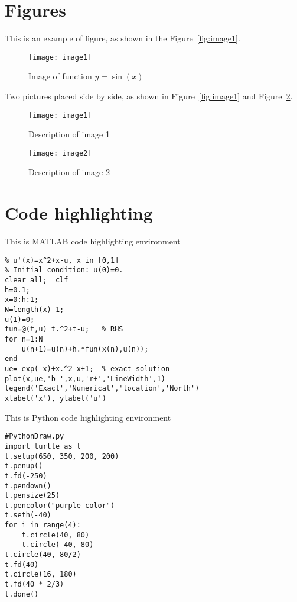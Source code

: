 \documentclass[12pt,en]{homework}
\begin{document}
\section*{Figures}

This is an example of figure, as shown in the Figure~\ref{fig:image1}.

\begin{figure}[htp!]
\centering
\texttt{[image: image1]}
\caption{Image of function $y=\sin(x)$}
\label{fig:sinx}
\end{figure}

Two pictures placed side by side, as shown in Figure~\ref{fig:image1} and Figure~\ref{fig:image2}.

\begin{figure}[!htp]
\begin{minipage}[h]{0.48\linewidth}
\centering
\texttt{[image: image1]}
\caption{Description of image 1}
\label{fig:image1}
\end{minipage}
\begin{minipage}[h]{0.48\linewidth}
\centering
\texttt{[image: image2]}
\caption{Description of image 2}
\label{fig:image2}
\end{minipage}
\end{figure}


\clearpage
\section*{Code highlighting}

This is MATLAB code highlighting environment


\begin{lstlisting}[style=matlab,title={MATLAB code}]
% Euler method for the ODE model
% u'(x)=x^2+x-u, x in [0,1]
% Initial condition: u(0)=0.
clear all;  clf
h=0.1;
x=0:h:1;
N=length(x)-1;
u(1)=0;
fun=@(t,u) t.^2+t-u;   % RHS
for n=1:N
    u(n+1)=u(n)+h.*fun(x(n),u(n));
end
ue=-exp(-x)+x.^2-x+1;  % exact solution
plot(x,ue,'b-',x,u,'r+','LineWidth',1)
legend('Exact','Numerical','location','North')
xlabel('x'), ylabel('u')
\end{lstlisting}

This is Python code highlighting environment

\begin{lstlisting}[style=python,title={Python code}]
#PythonDraw.py
import turtle as t
t.setup(650, 350, 200, 200)
t.penup()
t.fd(-250)
t.pendown()
t.pensize(25)
t.pencolor("purple color")
t.seth(-40)
for i in range(4):
    t.circle(40, 80)
    t.circle(-40, 80)
t.circle(40, 80/2)
t.fd(40)
t.circle(16, 180)
t.fd(40 * 2/3)
t.done()
\end{lstlisting}
\end{document}
